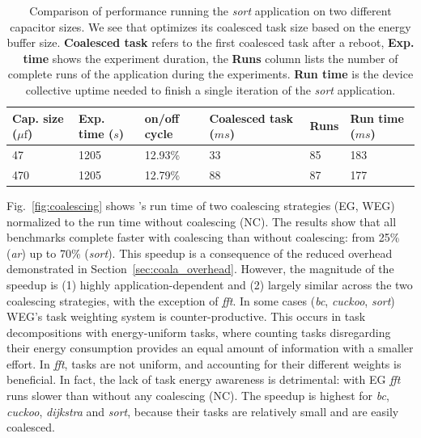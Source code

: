 \begin{table}[t]%

\caption{Comparison of \sys performance running the \textit{sort} application on two different capacitor sizes. We see that \sys optimizes its coalesced task size based on the energy buffer size.
\textbf{Coalesced task} refers to the first coalesced task after a reboot, \textbf{Exp. time} shows the experiment duration, the \textbf{Runs} column lists the number of complete runs of the application during the experiments. \textbf{Run time} is the device collective uptime needed to finish a single iteration of the \textit{sort} application.}
\label{tab:dif_cap}

\begin{minipage}{\columnwidth}
\begin{center}
\begin{tabular}{llllll}
  \toprule
    \textbf{Cap. size} ($\mu\text{f}$)& \textbf{Exp. time} ($s$)& \textbf{on/off cycle} & \textbf{Coalesced task} ($ms$)   & \textbf{Runs} & \textbf{Run time} ($ms$) \\
        \hline
    47                 &1205             & 12.93\%    & 33                        & 85       & 183      \\
    470                &1205             & 12.79\%    & 88                        & 87       & 177 \\
  \bottomrule
\end{tabular}
\end{center}
\end{minipage}  
\end{table}%

Fig.~\ref{fig:coalescing} shows \sys's run time of two coalescing
strategies (EG, WEG) normalized to the run time without coalescing (NC).
%
The results show that all benchmarks
complete faster with coalescing than without coalescing: from 25\%
(\textit{ar}) up to 70\% (\textit{sort}).
%
This speedup is a consequence of the reduced overhead demonstrated in
Section~\ref{sec:coala_overhead}.
%
However, the magnitude of the speedup is (1) highly application-dependent and
(2) largely similar across the two coalescing strategies, with the exception of
\textit{fft}.
%
In some cases (\textit{bc}, \textit{cuckoo}, \textit{sort}) WEG's task weighting
system is counter-productive.
%
This occurs in task decompositions with energy-uniform tasks, where counting
tasks disregarding their energy consumption provides an equal amount of information
with a smaller effort.
%
In \textit{fft}, tasks are not uniform, and accounting for their different weights is
beneficial. In fact, the lack of task energy awareness is detrimental: with EG
\textit{fft} runs slower than without any coalescing (NC).
%
The speedup is highest for \textit{bc}, \textit{cuckoo}, \textit{dijkstra} and
\textit{sort}, because their tasks are relatively small and are easily coalesced.
%

